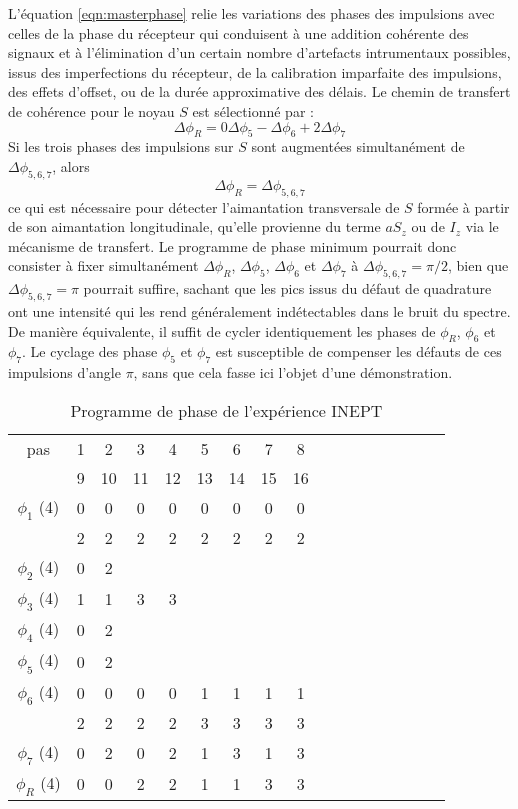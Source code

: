 L'équation \ref{eqn:masterphase} relie les variations des phases des impulsions
avec celles de la phase du récepteur qui conduisent à une addition cohérente des signaux
et à l'élimination d'un certain nombre d'artefacts intrumentaux possibles, issus
des imperfections du récepteur, de la calibration imparfaite des impulsions,
des effets d'offset, ou de la durée approximative des délais.
Le chemin de transfert de cohérence pour le noyau $S$ est sélectionné par :
\begin{equation}
\Delta\phi_R = 0\Delta\phi_5 - \Delta\phi_6 + 2\Delta\phi_7
\end{equation}
Si les trois phases des impulsions sur $S$
sont augmentées simultanément de $\Delta\phi_{5,6,7}$, alors
\begin{equation}
\Delta\phi_R = \Delta\phi_{5,6,7}
\end{equation}
ce qui est nécessaire pour détecter l'aimantation transversale de $S$
formée à partir de son aimantation longitudinale, qu'elle provienne
du terme $aS_z$ ou de $I_z$ via le mécanisme de transfert.
Le programme de phase minimum pourrait donc consister à fixer
simultanément $\Delta\phi_R$, $\Delta\phi_5$, $\Delta\phi_6$ et $\Delta\phi_7$
à $\Delta\phi_{5,6,7} = \pi/2$, bien que $\Delta\phi_{5,6,7} = \pi$ pourrait
suffire, sachant que les pics issus du défaut de quadrature ont une
intensité qui les rend généralement indétectables dans le bruit du spectre.
De manière équivalente, il suffit de cycler identiquement les phases
de $\phi_R$, $\phi_6$ et $\phi_7$.
Le cyclage des phase $\phi_5$ et $\phi_7$ est susceptible de compenser les
défauts de ces impulsions d'angle $\pi$, sans que cela fasse 
ici l'objet d'une démonstration.

\renewcommand{\baselinestretch}{1}
\normalsize
\begin{table}[hbt]
\begin{center}
\begin{tabular}{ccccccccccccccccc}
pas          &  1 &  2 &  3 &  4 &  5 &  6 &  7 &  8 \\
             &  9 & 10 & 11 & 12 & 13 & 14 & 15 & 16 \\
\hline
$\phi_1$ (4) &  0 &  0 &  0 &  0 &  0 &  0 &  0 &  0 \\
             &  2 &  2 &  2 &  2 &  2 &  2 &  2 &  2 \\
$\phi_2$ (4) &  0 &  2 \\
$\phi_3$ (4) &  1 &  1 &  3 &  3 \\
$\phi_4$ (4) &  0 &  2 \\
$\phi_5$ (4) &  0 &  2 \\
$\phi_6$ (4) &  0 &  0 &  0 &  0 &  1 &  1 &  1 &  1 \\
             &  2 &  2 &  2 &  2 &  3 &  3 &  3 &  3 \\
$\phi_7$ (4) &  0 &  2 &  0 &  2 &  1 &  3 &  1 &  3 \\
$\phi_R$ (4) &  0 &  0 &  2 &  2 &  1 &  1 &  3 &  3 \\
\hline
\end{tabular}
\caption{\label{tab:inept}
Programme de phase de l'expérience INEPT}
\end{center}
\end{table}
\renewcommand{\baselinestretch}{1.5}
\normalsize

